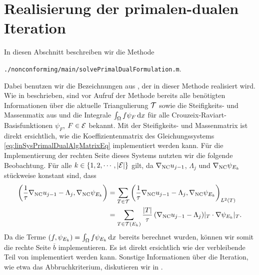 \section{Realisierung der primalen-dualen Iteration}
\label{sec:implementationPrimalDualIteration}
In diesen Abschnitt beschreiben wir die Methode
\begin{center}
  \texttt{./nonconforming/main/solvePrimalDualFormulation.m}.
\end{center}
Dabei benutzen wir die Bezeichnungen aus , der
in dieser Methode realisiert wird.
Wie in  beschrieben, sind vor Aufruf der Methode bereits
alle benötigten Informationen über die aktuelle Triangulierung $\mathcal{T}$
sowie die Steifig\-keits- und Massenmatix aus 
und die Integrale $\int_\Omega f\psi_F\,\mathrm{d}x$ für alle
Crouzeix-Raviart-Basisfunktionen $\psi_F$, $F\in\mathcal{E}$ bekannt.
Mit der Steifigkeits- und Massenmatrix ist direkt ersichtlich,
wie die Koeffizientenmatrix des Gleichungssystems
\eqref{eq:linSysPrimalDualAlgMatrixEq} implementiert werden kann.
Für die Implementierung der rechten Seite dieses Systems nutzten wir die
folgende Beobachtung.
Für alle $k\in\{1,2,\cdots,|\mathcal{E}|\}$ gilt, da $\nabla_\textup{NC} u_{j-1}$,
$\Lambda_j$ und $\nabla_\textup{NC} \psi_{E_k}$ stückweise konstant sind, dass
\begin{align*}
  \left(\frac{1}{\tau}\nabla_\textup{NC} u_{j-1}-\Lambda_j,\nabla_\textup{NC}\psi_{E_k}\right)
  &=
  \sum_{T\in\mathcal{T}}
  \left(\frac{1}{\tau}\nabla_\textup{NC} u_{j-1}-\Lambda_j,
  \nabla_\textup{NC}\psi_{E_k}\right)_{L^2(T)}\\
  &=
  \sum_{T\in\mathcal{T}(E_k)}
  \frac{|T|}{\tau}\left(\nabla_\textup{NC} u_{j-1}-\Lambda_j\right)\!|_T\cdot
  \nabla\psi_{E_k}|_T.
\end{align*}
Da die Terme $\left(f,\psi_{E_k}\right)=\int_\Omega f\psi_{E_k}\,\mathrm{d}x$ bereits
berechnet wurden, können wir somit die rechte Seite $\overline b$
implementieren.
Es ist direkt ersichtlich wie der verbleibende Teil von
 implementiert werden kann.
Sonstige Informationen über die Iteration, wie etwa das Abbruchkriterium,
diskutieren wir in .

